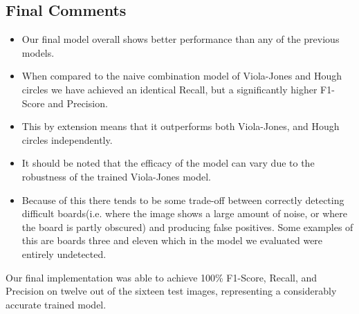 \documentclass[conference]{IEEEtran}
\begin{document}
\subsection{Final Comments}
\begin{itemize}
	\item Our final model overall shows better performance than any of the previous models. 
	
	\item When compared to the naive combination model of Viola-Jones and Hough circles we have achieved an identical Recall, but a significantly higher F1-Score and Precision.
	
	\item This by extension means that it outperforms both Viola-Jones, and Hough circles independently. 
	
	\item It should be noted that the efficacy of the model can vary due to the robustness of the trained Viola-Jones model.
	
	\item Because of this there tends to be some trade-off between correctly detecting difficult boards(i.e. where the image shows a large amount of noise, or where the board is partly obscured) and producing false positives. Some examples of this are boards three and eleven which in the model we evaluated were entirely undetected.
	
\end{itemize}

Our final implementation was able to achieve 100\% F1-Score, Recall, and Precision on twelve out of the sixteen test images, representing a considerably accurate trained model.
\end{document}

